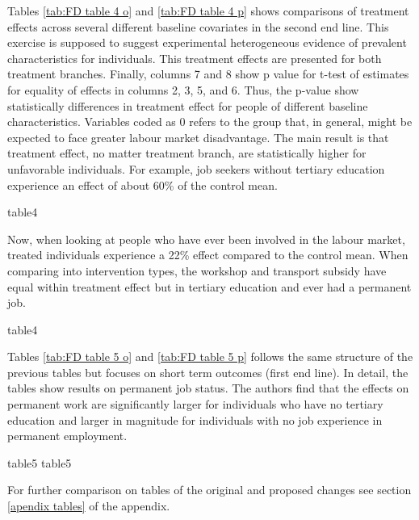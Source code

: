 \documentclass{article}
\begin{document}
\noindent Tables \ref{tab:FD table 4 o} and \ref{tab:FD table 4 p} shows comparisons of treatment effects across several different baseline covariates in the second end line. This exercise is supposed to suggest experimental heterogeneous evidence of prevalent characteristics for individuals. This treatment effects are presented for both treatment branches. Finally, columns 7 and 8 show p value for t-test of estimates for equality of effects in columns 2, 3, 5, and 6. Thus, the p-value show statistically differences in treatment effect for people of different baseline characteristics. Variables coded as 0 refers to the group that, in general, might be expected to face greater labour market disadvantage. The main result is that treatment effect, no matter treatment branch, are statistically higher for unfavorable individuals. For example, job seekers without tertiary education experience an effect of about 60\% of the control mean.

{table4}\label{tab:FD table 4 o}

\noindent Now, when looking at people who have ever been involved in the labour market, treated individuals experience a 22\% effect compared to the control mean. When comparing into intervention types, the workshop and transport subsidy have equal within treatment effect but in tertiary education and ever had a permanent job. 

{table4}\label{tab:FD table 4 p}

\newpage

\noindent Tables \ref{tab:FD table 5 o} and \ref{tab:FD table 5 p} follows the same structure of the previous tables but focuses on short term outcomes (first end line). In detail, the tables show results on permanent job status. The authors find that the effects on permanent work are significantly larger for individuals who have no tertiary education and larger in magnitude for individuals with no job experience in permanent employment.

{table5}\label{tab:FD table 5 o}
{table5}\label{tab:FD table 5 p}

\noindent For further comparison on tables  of the original and proposed changes see section \ref{apendix tables} of the appendix.
\end{document}
